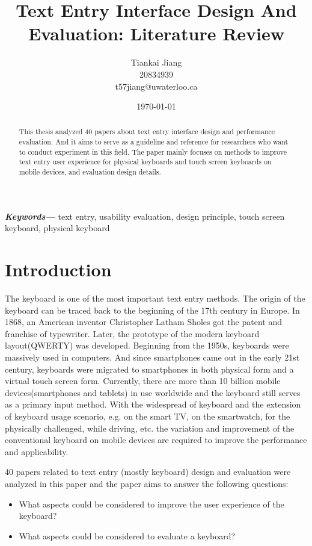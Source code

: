 \documentclass[11pt]{article}
\title{Text Entry Interface Design And Evaluation: Literature Review}
\author{Tiankai Jiang\\20834939\\t57jiang@uwaterloo.ca}
\date{\today}
\providecommand{\keywords}[1]
{
  \small    
  \textbf{\textit{Keywords---}} #1
}
\begin{document}
\maketitle

\begin{abstract}
This thesis analyzed 40 papers about text entry interface design and performance evaluation. And it aims to serve as a guideline and reference for researchers who want to conduct experiment in this field. The paper mainly focuses on methods to improve text entry user experience for physical keyboards and touch screen keyboards on mobile devices, and evaluation design details.
\end{abstract}

\keywords{text entry, usability evaluation, design principle, touch screen keyboard, physical keyboard}

\section{Introduction}\label{section-introduction}
The keyboard is one of the most important text entry methods. The origin of the keyboard can be traced back to the beginning of the 17th century in Europe. In 1868, an American inventor Christopher Latham Sholes got the patent and franchise of typewriter. Later, the prototype of the modern keyboard layout(QWERTY) was developed. Beginning from the 1950s, keyboards were massively used in computers. And since smartphones came out in the early 21st century, keyboards were migrated to smartphones in both physical form and a virtual touch screen form. Currently, there are more than 10 billion mobile devices(smartphones and tablets) in use worldwide and the keyboard still serves as a primary input method. With the widespread of keyboard and the extension of keyboard usage scenario, e.g. on the smart TV, on the smartwatch, for the physically challenged, while driving, etc. the variation and improvement of the conventional keyboard on mobile devices are required to improve the performance and applicability.

40 papers related to text entry (mostly keyboard) design and evaluation were analyzed in this paper and the paper aims to answer the following questions:
\begin{itemize}
    \item What aspects could be considered to improve the user experience of the keyboard?
    \item What aspects could be considered to evaluate a keyboard?
\end{itemize}
\end{document}
